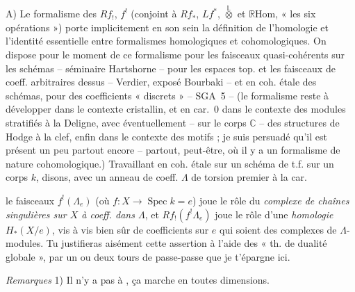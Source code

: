 \documentclass[11pt,a4paper]{article}
\begin{document}
A) Le formalisme des $Rf_!$, $f^!$ (conjoint à $Rf_*$, $Lf^*$, $\overset{\mathbb{L}}{\otimes}$ et $\mathbb{R}\mathrm{Hom}$, « les six opérations ») porte implicitement en son sein la définition de l'homologie et l'identité essentielle entre formalismes homologiques et cohomologiques. \struck{\ill{}} On dispose pour le moment de ce formalisme pour les faisceaux quasi-cohérents sur les schémas -- séminaire Hartshorne -- pour les espaces top. et les faisceaux de coeff. arbitraires dessus -- Verdier, exposé Bourbaki -- et en coh. étale des schémas, pour des coefficients « discrets »   -- SGA~5 -- (le formalisme reste à développer dans le contexte cristallin, et en car.~0 dans le contexte des modules stratifiés  à la Deligne, avec éventuellement -- sur le corps $\mathbb{C}$ -- des structures de Hodge à la clef, enfin dans le contexte des motifs ; je suis persuadé qu'il est présent un peu partout encore -- partout, peut-être, où il y a un formalisme de nature cohomologique.) Travaillant en coh. étale sur un schéma  de t.f. sur un corps $k$, disons, avec un anneau de coeff. $\Lambda$ de torsion premier à la car.

le  faisceaux $f^!(\Lambda_e)$ (où $f\colon X \to \operatorname{Spec} k = e$) joue le rôle du \emph{complexe de chaînes singulières sur $X$ à coeff. dans $\Lambda$}, et $Rf_!(f^!\Lambda_e)$ joue le rôle d'une \emph{homologie} $H_*(X/e)$, vis à vis bien sûr de coefficients sur $e$ qui soient des complexes de $\Lambda$-modules. Tu justifieras aisément cette assertion à l'aide des « th. de dualité globale », par un ou deux tours de passe-passe que je t'épargne ici.

\emph{Remarques} 1) Il n'y a pas à \ill{}, ça marche en toutes dimensions.
\end{document}
